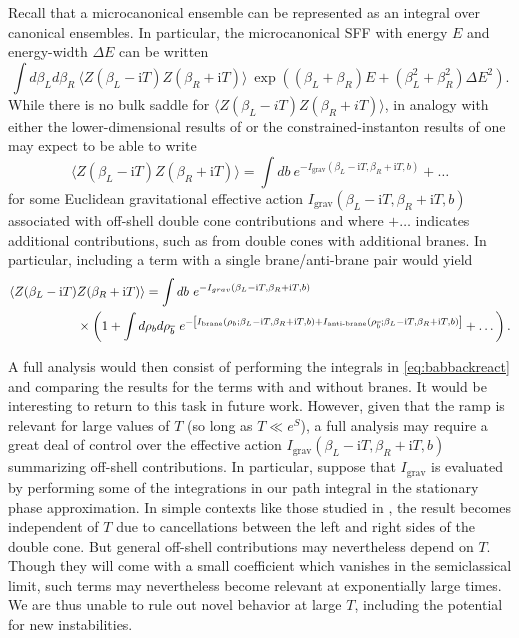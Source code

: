 \documentclass[11pt]{article}
\renewcommand{\i}{\mathrm{i}}
\begin{document}
Recall \cite{SSS-1,Marolf:2018ldl} that a microcanonical ensemble can be represented as an integral over canonical ensembles.  
In particular, the microcanonical SFF with energy $E$ and energy-width $\Delta E$ can be written
\begin{equation}
\int d\beta_L d\beta_R \ \langle Z(\beta_L - \i T) Z(\beta_R + \i T)\rangle \  \exp\left((\beta_L +\beta_R)E +(\beta_L^2 + \beta_R^2)\Delta E^2  \right).
\end{equation}
While there is no bulk saddle for $\langle Z(\beta_L - iT) Z(\beta_R + iT)\rangle$, in analogy with either the lower-dimensional results of \cite{SSS-1} or the constrained-instanton results of \cite{Cotler:2020lxj} one may expect to be able to write 
\begin{equation}
\langle Z(\beta_L - \i T) Z(\beta_R + \i T)\rangle = \int db \ e^{-I_{\text{grav}}(\beta_L-\i T , \beta_R+\i T, b)} + \dots
\end{equation}
for some Euclidean gravitational effective action $I_{\text{grav}}(\beta_L -\i T, \beta_R +\i T, b)$ associated with off-shell double cone contributions and where $+\dots$ indicates additional contributions, such as from double cones with additional branes.  
In particular, including a term with a single brane/anti-brane pair would yield
\begin{align}
\label{eq:babbackreact}
\langle Z(\beta_L -\i T) &Z(\beta_R + \i T)\rangle = \int db \ e^{-I_{grav}(\beta_L -\i T, \beta_R+\i T, b)} \notag \\ 
&\times \left( 1  + \int d\rho_{b} d\rho_{\overline{b}} \ e^{-\left[ I_{\text{brane}}(\rho_{b}; \beta_L-\i T, \beta_R+\i T, b) + I_{\text{anti-brane}}(\rho_{\overline{b}}; \beta_L-\i T, \beta_R+\i T, b) \right]} + \dots\right). 
\end{align}

A full analysis would then consist of performing the integrals in \eqref{eq:babbackreact} and comparing the results for the terms with and without branes.  
It would be interesting to return to this task in future work.
However, given that the ramp is relevant for large values of $T$ (so long as $T \ll e^S$), a full analysis may require a great deal of control over the effective action $I_{\text{grav}}(\beta_L -\i T, \beta_R +\i T, b)$ summarizing off-shell contributions.  
In particular, suppose that $I_{\text{grav}}$ is evaluated by performing some of the integrations in our path integral in the stationary phase approximation.  
In simple contexts like those studied in \cite{Cotler:2020lxj}, the result becomes independent of $T$ due to cancellations between the left and right sides of the double cone.  
But general off-shell contributions may nevertheless depend on $T$.  
Though they will come with a small coefficient which vanishes in the semiclassical limit, such terms may nevertheless become relevant at exponentially large times.  
We are thus unable to rule out novel behavior at large $T$, including the potential for new instabilities.
\end{document}
